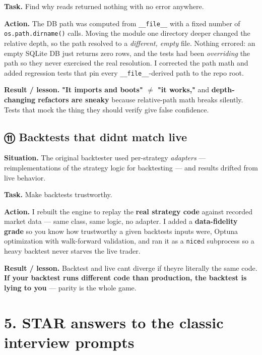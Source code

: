 \documentclass[11pt]{article}
\begin{document}
\textbf{Task.} Find why reads returned nothing with no error anywhere.

\textbf{Action.} The DB path was computed from \texttt{\_\_file\_\_} with a fixed number of \texttt{os.path.dirname()}
calls. Moving the module one directory deeper changed the relative depth, so the path resolved to
a \emph{different, empty} file. Nothing errored: an empty SQLite DB just returns zero rows, and the
tests had been \emph{overriding} the path so they never exercised the real resolution. I corrected the
path math and added regression tests that pin every \texttt{\_\_file\_\_}-derived path to the repo root.

\textbf{Result / lesson.} \textbf{"It imports and boots" \(\neq\) "it works,"} and \textbf{depth-changing refactors are
sneaky} because relative-path math breaks silently. Tests that mock the thing they should verify
give false confidence.

\subsection{⑪ Backtests that didn\textquotesingle t match live}\label{ux246a-backtests-that-didnt-match-live}

\textbf{Situation.} The original backtester used per-strategy \emph{adapters} --- reimplementations of the
strategy logic for backtesting --- and results drifted from live behavior.

\textbf{Task.} Make backtests trustworthy.

\textbf{Action.} I rebuilt the engine to replay the \textbf{real strategy code} against recorded market
data --- same class, same logic, no adapter. I added a \textbf{data-fidelity grade} so you know how
trustworthy a given backtest\textquotesingle s inputs were, Optuna optimization with walk-forward validation, and
ran it as a \texttt{nice}d subprocess so a heavy backtest never starves the live trader.

\textbf{Result / lesson.} Backtest and live can\textquotesingle t diverge if they\textquotesingle re literally the same code. \textbf{If
your backtest runs different code than production, the backtest is lying to you} --- parity is the
whole game.

\section{5. STAR answers to the classic interview prompts}\label{5-star-answers-to-the-classic-interview-prompts}
\end{document}
